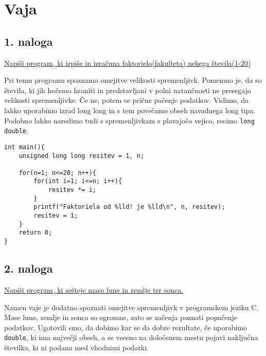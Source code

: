 \documentclass[a4paper, 12pt]{article}
\begin{document}
	
\section{Vaja}
\subsection*{1. naloga}

\underline{Napiši program, ki izpiše in izračuna faktorielo(fakulteta) nekega števila(1-20)}\

Pri temu programu spoznamo omejitve velikosti spremenljivk. Pomemno je, da so števila, ki jih hočemo hraniti in predstavljani v polni natančnosti ne presegajo velikosti spremenljivke. Če ne, potem se prične pačenje podatkov. Vidimo, da lahko uporabimo izrad long long in s tem povečamo obseh navadnega long tipa. Podobno lahko naredimo tudi s spremenljivkam s plavajočo vejico, recimo \lstinline|long double|.
\begin{lstlisting}
int main(){
	unsigned long long resitev = 1, n;

	for(n=1; n<=20; n++){
		for(int i=1; i<=n; i++){
			resitev *= i;
		}
		printf("Faktoriela od %lld! je %lld\n", n, resitev);
		resitev = 1;
	}
	return 0;
}
\end{lstlisting}

\subsection*{2. naloga}
	
\underline{Napiši program, ki sešteje maso lune in zemlje ter sonca.}\

Namen vaje je dodatno spoznati omejitve spremenljivk v programskem jeziku C. Mase lune, zemlje in sonca so ogromne, zato se začenja poznati popačenje podatkov. Ugotovili smo, da dobimo kar se da dobre rezultate, če uporabimo \lstinline|double|, ki ima največji obseh, a se vseeno na določenem mestu pojavi naključna številka, ki ni podana med vhodnimi podatki.
\end{document}
